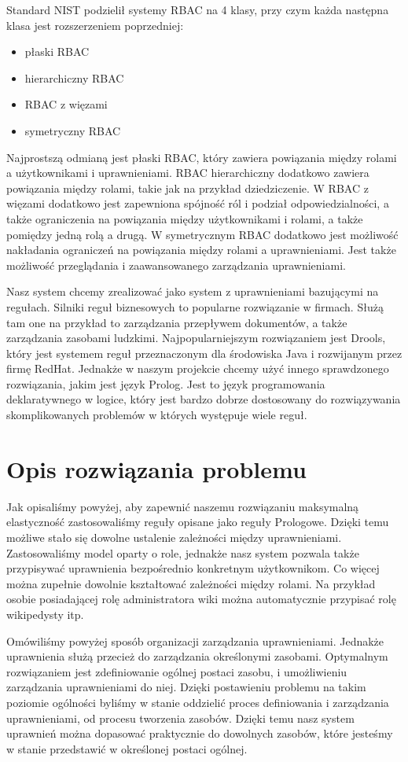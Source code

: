 \documentclass{classrep}
\begin{document}
Standard NIST podzielił systemy RBAC na 4 klasy, przy czym każda następna klasa jest rozszerzeniem poprzedniej:
\begin{itemize}
\item płaski RBAC
\item hierarchiczny RBAC
\item RBAC z więzami
\item symetryczny RBAC
\end{itemize}
Najprostszą odmianą jest płaski RBAC, który zawiera powiązania między rolami a użytkownikami i uprawnieniami. RBAC hierarchiczny dodatkowo zawiera powiązania między rolami,
takie jak na przykład dziedziczenie. W RBAC z więzami dodatkowo jest zapewniona spójność ról i podział odpowiedzialności, a także ograniczenia na powiązania między użytkownikami
i rolami, a także pomiędzy jedną rolą a drugą. W symetrycznym RBAC dodatkowo jest możliwość nakładania ograniczeń na powiązania między rolami a uprawnieniami. Jest także możliwość przeglądania
i zaawansowanego zarządzania uprawnieniami.

Nasz system chcemy zrealizować jako system z uprawnieniami bazującymi na regułach. Silniki reguł biznesowych to popularne rozwiązanie w firmach. Służą tam one na przykład to zarządzania
przepływem dokumentów, a także zarządzania zasobami ludzkimi. Najpopularniejszym rozwiązaniem jest Drools\cite{Drools}, który jest systemem reguł przeznaczonym dla środowiska Java i rozwijanym
przez firmę RedHat. Jednakże w naszym projekcie chcemy użyć innego sprawdzonego rozwiązania, jakim jest język Prolog\cite{Prolog}. Jest to język programowania deklaratywnego w logice,
który jest bardzo dobrze dostosowany do rozwiązywania skomplikowanych problemów w których występuje wiele reguł. 
\section{Opis rozwiązania problemu}
Jak opisaliśmy powyżej, aby zapewnić naszemu rozwiązaniu maksymalną elastyczność zastosowaliśmy reguły opisane jako reguły Prologowe. Dzięki temu możliwe stało się dowolne ustalenie zależności
między uprawnieniami. Zastosowaliśmy model oparty o role, jednakże nasz system pozwala także przypisywać uprawnienia bezpośrednio konkretnym użytkownikom. Co więcej można zupełnie
dowolnie kształtować zależności między rolami. Na przykład osobie posiadającej rolę administratora wiki można automatycznie przypisać rolę wikipedysty itp.

Omówiliśmy powyżej sposób organizacji zarządzania uprawnieniami. Jednakże uprawnienia służą przecież do zarządzania określonymi zasobami. Optymalnym rozwiązaniem jest
zdefiniowanie ogólnej postaci zasobu, i umożliwieniu zarządzania uprawnieniami do niej. Dzięki postawieniu problemu na takim poziomie ogólności byliśmy w stanie oddzielić proces
definiowania i zarządzania uprawnieniami, od procesu tworzenia zasobów. Dzięki temu nasz system uprawnień można dopasować praktycznie do dowolnych zasobów, które jesteśmy w stanie
przedstawić w określonej postaci ogólnej. 
\end{document}
